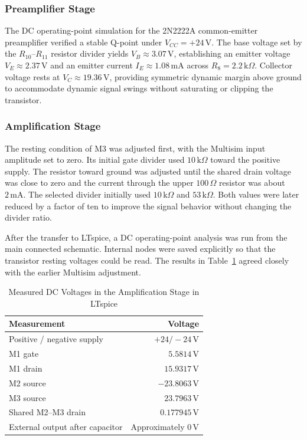 \documentclass[conference]{IEEEtran}
\begin{document}
\subsubsection{Preamplifier Stage}
The DC operating-point simulation for the 2N2222A common-emitter preamplifier verified a stable Q-point under $V_{CC} = +24\,\mathrm{V}$. The base voltage set by the $R_{10}$--$R_{11}$ resistor divider yields $V_B \approx 3.07\,\mathrm{V}$, establishing an emitter voltage $V_E \approx 2.37\,\mathrm{V}$ and an emitter current $I_E \approx 1.08\,\mathrm{mA}$ across $R_8 = 2.2\,\mathrm{k}\Omega$. Collector voltage rests at $V_C \approx 19.36\,\mathrm{V}$, providing symmetric dynamic margin above ground to accommodate dynamic signal swings without saturating or clipping the transistor.

\subsubsection{Amplification Stage}
The resting condition of M3 was adjusted first, with the Multisim input amplitude set to zero. Its initial gate divider used $10\,\mathrm{k}\Omega$ toward the positive supply. The resistor toward ground was adjusted until the shared drain voltage was close to zero and the current through the upper $100\,\Omega$ resistor was about $2\,\mathrm{mA}$. The selected divider initially used $10\,\mathrm{k}\Omega$ and $53\,\mathrm{k}\Omega$. Both values were later reduced by a factor of ten to improve the signal behavior without changing the divider ratio.

After the transfer to LTspice, a DC operating-point analysis was run from the main connected schematic. Internal nodes were saved explicitly so that the transistor resting voltages could be read. The results in Table~\ref{tab:amplification_dc} agreed closely with the earlier Multisim adjustment.

\begin{table}[H]
\caption{Measured DC Voltages in the Amplification Stage in LTspice}
\label{tab:amplification_dc}
\centering
\begin{tabular}{lr}
\toprule
Measurement & Voltage \\
\midrule
Positive / negative supply & $+24 / -24\,\mathrm{V}$ \\
M1 gate & $5.5814\,\mathrm{V}$ \\
M1 drain & $15.9317\,\mathrm{V}$ \\
M2 source & $-23.8063\,\mathrm{V}$ \\
M3 source & $23.7963\,\mathrm{V}$ \\
Shared M2--M3 drain & $0.177945\,\mathrm{V}$ \\
External output after capacitor & Approximately $0\,\mathrm{V}$ \\
\bottomrule
\end{tabular}
\end{table}
\end{document}
